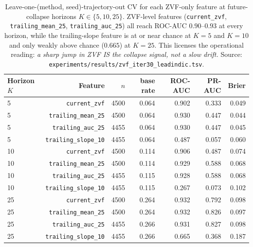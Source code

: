 \begin{table}[htbp]
\centering
\small
\setlength{\tabcolsep}{4pt}
\begin{tabular}{lrrrrrr}
\hline
Horizon $K$ & Feature & $n$ & base rate & ROC-AUC & PR-AUC & Brier \\
\hline
5  & \texttt{current\_zvf}        & 4500 & 0.064 & 0.902 & 0.333 & 0.049 \\
5  & \texttt{trailing\_mean\_25}  & 4500 & 0.064 & 0.930 & 0.447 & 0.044 \\
5  & \texttt{trailing\_auc\_25}   & 4455 & 0.064 & 0.930 & 0.447 & 0.045 \\
5  & \texttt{trailing\_slope\_10} & 4455 & 0.064 & 0.487 & 0.057 & 0.060 \\
10 & \texttt{current\_zvf}        & 4500 & 0.114 & 0.906 & 0.487 & 0.074 \\
10 & \texttt{trailing\_mean\_25}  & 4500 & 0.114 & 0.929 & 0.588 & 0.068 \\
10 & \texttt{trailing\_auc\_25}   & 4455 & 0.115 & 0.928 & 0.588 & 0.068 \\
10 & \texttt{trailing\_slope\_10} & 4455 & 0.115 & 0.267 & 0.073 & 0.102 \\
25 & \texttt{current\_zvf}        & 4500 & 0.264 & 0.932 & 0.792 & 0.098 \\
25 & \texttt{trailing\_mean\_25}  & 4500 & 0.264 & 0.932 & 0.826 & 0.097 \\
25 & \texttt{trailing\_auc\_25}   & 4455 & 0.266 & 0.931 & 0.827 & 0.098 \\
25 & \texttt{trailing\_slope\_10} & 4455 & 0.266 & 0.665 & 0.368 & 0.187 \\
\hline
\end{tabular}
\caption{Leave-one-(method, seed)-trajectory-out CV for each ZVF-only feature
at future-collapse horizons $K \in \{5, 10, 25\}$. ZVF-level features
(\texttt{current\_zvf}, \texttt{trailing\_mean\_25}, \texttt{trailing\_auc\_25})
all reach ROC-AUC $0.90$--$0.93$ at every horizon, while the trailing-slope
feature is at or near chance at $K{=}5$ and $K{=}10$ and only weakly above
chance ($0.665$) at $K{=}25$. This licenses the operational reading:
\emph{a sharp jump in ZVF IS the collapse signal, not a slow drift.}
Source: \texttt{experiments/results/zvf\_iter30\_leadindic.tsv}.}
\label{tab:zvf-iter30-leadindic}
\end{table}


